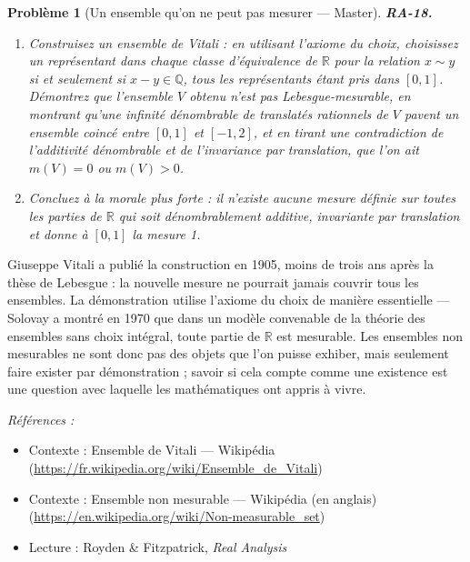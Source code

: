 \documentclass[11pt]{article}
\newtheorem{problem}{Problème}
\newenvironment{refs}{\par\small\noindent\emph{Références :}\begin{itemize}\setlength\itemsep{0pt}}{\end{itemize}\normalsize}
\begin{document}
\begin{problem}[{Un ensemble qu'on ne peut pas mesurer --- Master}]
\textbf{RA-18.} \begin{enumerate}
\item[(a)] Construisez un ensemble de Vitali : en utilisant l'axiome du choix,
choisissez un représentant dans chaque classe d'équivalence de $ \mathbb{R} $ pour la relation
$ x \sim y $ si et seulement si $ x - y \in \mathbb{Q} $, tous les représentants étant pris dans
$ [0, 1] $. Démontrez que l'ensemble $ V $ obtenu n'est pas Lebesgue-mesurable, en montrant
qu'une infinité dénombrable de translatés rationnels de $ V $ pavent un ensemble coincé entre
$ [0, 1] $ et $ [-1, 2] $, et en tirant une contradiction de l'additivité dénombrable et de
l'invariance par translation, que l'on ait $ m(V) = 0 $ ou $ m(V) > 0 $.
\item[(b)] Concluez à la morale plus forte :
il n'existe \textit{aucune} mesure définie sur \textit{toutes} les parties de $ \mathbb{R} $ qui soit
dénombrablement additive, invariante par translation et donne à $ [0, 1] $ la mesure 1.
\end{enumerate}

\end{problem}

\noindent Giuseppe Vitali a publié la construction en 1905, moins de trois ans après la
thèse de Lebesgue : la nouvelle mesure ne pourrait jamais couvrir tous les ensembles. La
démonstration utilise l'axiome du choix de manière essentielle --- Solovay a montré en 1970 que dans
un modèle convenable de la théorie des ensembles sans choix intégral, toute partie de $\mathbb{R}$ est
mesurable. Les ensembles non mesurables ne sont donc pas des objets que l'on puisse exhiber, mais
seulement faire exister par démonstration ; savoir si cela compte comme une existence est une
question avec laquelle les mathématiques ont appris à vivre.

\begin{refs}
\item Contexte : Ensemble de Vitali --- Wikipédia (\url{https://fr.wikipedia.org/wiki/Ensemble_de_Vitali})
\item Contexte : Ensemble non mesurable --- Wikipédia (en anglais) (\url{https://en.wikipedia.org/wiki/Non-measurable_set})
\item Lecture : Royden \& Fitzpatrick, \textit{Real Analysis}
\end{refs}

\bigskip
\end{document}
